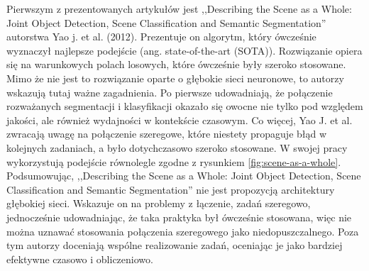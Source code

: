 \vspace{0.5cm}

Pierwszym z prezentowanych artykułów jest ,,Describing the Scene as a Whole: Joint Object Detection, Scene Classification and Semantic Segmentation'' autorstwa Yao j. et al. (2012)\cite{yao2012describing}. Prezentuje on algorytm, który ówcześnie wyznaczył najlepsze podejście (ang. state-of-the-art (SOTA)). Rozwiązanie opiera się na warunkowych polach losowych, które ówcześnie były szeroko stosowane. Mimo że nie jest to rozwiązanie oparte o głębokie sieci neuronowe, to autorzy wskazują tutaj ważne zagadnienia. Po pierwsze udowadniają, że połączenie rozważanych segmentacji i klasyfikacji okazało się owocne nie tylko pod względem jakości, ale również wydajności w kontekście czasowym. Co więcej, Yao J. et al. zwracają uwagę na połączenie szeregowe, które niestety propaguje błąd w kolejnych zadaniach, a było dotychczasowo szeroko stosowane. W swojej pracy wykorzystują podejście równolegle zgodne z rysunkiem \ref{fig:scene-as-a-whole}. Podsumowując, ,,Describing the Scene as a Whole: Joint Object Detection, Scene Classification and Semantic Segmentation'' nie jest propozycją architektury głębokiej sieci. Wskazuje on na problemy z łączenie, zadań szeregowo, jednocześnie udowadniając, że taka praktyka był ówcześnie stosowana, więc nie można uznawać stosowania połączenia szeregowego jako niedopuszczalnego. Poza tym autorzy doceniają wspólne realizowanie zadań, oceniając je jako bardziej efektywne czasowo i obliczeniowo.

